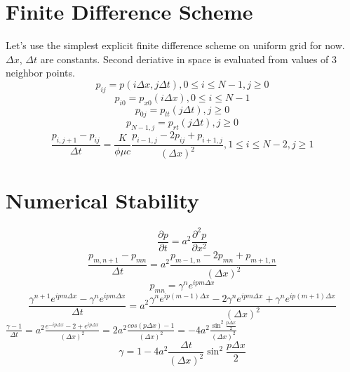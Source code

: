 \documentclass{article}
\begin{document}
\section{Finite Difference Scheme}

Let's use the simplest explicit finite difference scheme on uniform grid for
now. $\Delta x$, $\Delta t$ are constants. Second deriative in space is
evaluated from values of 3 neighbor points.
\begin{equation}
p_{i j} = p(i \Delta x, j \Delta t), 0 \leq i \leq N - 1, j \geq 0
\end{equation}
\begin{equation}
p_{i 0} = p_{x 0}(i \Delta x), 0 \leq i \leq N - 1
\end{equation}
\begin{equation}
p_{0 j} = p_{l t}(j \Delta t), j \geq 0
\end{equation}
\begin{equation}
p_{N - 1, j} = p_{r t}(j \Delta t), j \geq 0
\end{equation}
\begin{equation}
\frac{p_{i, j + 1} - p_{i j}}{\Delta t} = \frac{K}{\phi \mu c} \frac{p_{i - 1,
j} - 2 p_{i j} + p_{i + 1, j}}{(\Delta x)^2}, 1 \leq i \leq N - 2, j \geq 1
\end{equation}

\section{Numerical Stability}

\begin{equation}
\frac{\partial p}{\partial t} = a^2 \frac{\partial^2 p}{\partial x^2}
\end{equation}
\begin{equation}
\frac{p_{m, n + 1} - p_{m n}}{\Delta t} = a^2 \frac{p_{m - 1, n} - 2 p_{m n} +
p_{m + 1, n}}{(\Delta x)^2}
\end{equation}
\begin{equation}
p_{m n} = \gamma^n e^{i p m \Delta x}
\end{equation}
\begin{equation}
\frac{\gamma^{n + 1} e^{i p m \Delta x} - \gamma^n e^{i p m \Delta x}}{\Delta
t} = a^2 \frac{\gamma^n e^{i p (m - 1) \Delta x} - 2 \gamma^n e^{i p m \Delta
x} + \gamma^n e^{i p (m + 1) \Delta x}}{(\Delta x)^2}
\end{equation}
$\frac{\gamma - 1}{\Delta t} = a^2 \frac{e^{-i p \Delta x} - 2 + e^{i p \Delta
x}}{(\Delta x)^2} = 2 a^2 \frac{cos(p \Delta x) - 1}{(\Delta x)^2} = -4 a^2
\frac{\sin^2 \frac{p \Delta x}{2}}{(\Delta x)^2}$
\begin{equation}
\gamma = 1 - 4 a^2 \frac{\Delta t}{(\Delta x)^2} \sin^2 \frac{p \Delta x}{2}
\end{equation}
\end{document}
